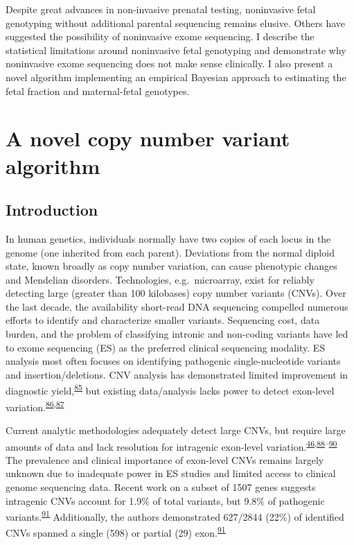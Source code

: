 \documentclass[11pt,letterpaper]{book}
\begin{document}
Despite great advances in non-invasive prenatal testing, noninvasive fetal genotyping without additional parental sequencing remains elusive.
Others have suggested the possibility of noninvasive exome sequencing.
I describe the statistical limitations around noninvasive fetal genotyping and demonstrate why noninvasive exome sequencing does not make sense clinically.
I also present a novel algorithm implementing an empirical Bayesian approach to estimating the fetal fraction and maternal-fetal genotypes.

\hypertarget{a-novel-copy-number-variant-algorithm}{%
\chapter{A novel copy number variant algorithm}\label{a-novel-copy-number-variant-algorithm}}

\hypertarget{introduction}{%
\section{Introduction}\label{introduction}}

In human genetics, individuals normally have two copies of each locus in the genome (one inherited from each parent).
Deviations from the normal diploid state, known broadly as copy number variation, can cause phenotypic changes and Mendelian disorders.
Technologies, e.g.~microarray, exist for reliably detecting large (greater than 100 kilobases) copy number variants (CNVs).
Over the last decade, the availability short-read DNA sequencing compelled numerous efforts to identify and characterize smaller variants.
Sequencing cost, data burden, and the problem of classifying intronic and non-coding variants have led to exome sequencing (ES) as the preferred clinical sequencing modality.
ES analysis most often focuses on identifying pathogenic single-nucleotide variants and insertion/deletions.
CNV analysis has demonstrated limited improvement in diagnostic yield,\textsuperscript{\protect\hyperlink{ref-marchuk:2018aa}{85}} but existing data/analysis lacks power to detect exon-level variation.\textsuperscript{\protect\hyperlink{ref-retterer:2015aa}{86},\protect\hyperlink{ref-yao:2017aa}{87}}

Current analytic methodologies adequately detect large CNVs, but require large amounts of data and lack resolution for intragenic exon-level variation.\textsuperscript{\protect\hyperlink{ref-plagnol:2012aa}{46},\protect\hyperlink{ref-fromer:2012aa}{88}--\protect\hyperlink{ref-krumm:2012aa}{90}}
The prevalence and clinical importance of exon-level CNVs remains largely unknown due to inadequate power in ES studies and limited access to clinical genome sequencing data.
Recent work on a subset of 1507 genes suggests intragenic CNVs account for 1.9\% of total variants, but 9.8\% of pathogenic variants.\textsuperscript{\protect\hyperlink{ref-truty:2019aa}{91}}
Additionally, the authors demonstrated 627/2844 (22\%) of identified CNVs spanned a single (598) or partial (29) exon.\textsuperscript{\protect\hyperlink{ref-truty:2019aa}{91}}
\end{document}
